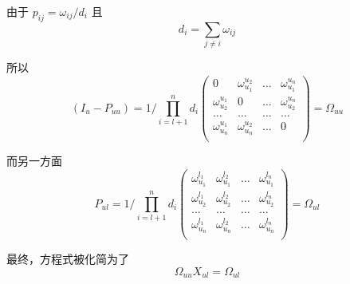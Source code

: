 \documentclass[notheorems, UTF8]{ctexbeamer}
\begin{document}
\begin{frame}
由于 $p_{ij} = \omega_{ij} / d_i$ 且 
\begin{displaymath}
d_i = \sum_{j \neq i} \omega_{ij}
\end{displaymath}

所以
\begin{displaymath}
(I_u - P_{uu}) = 1 / \prod_{i = l + 1}^{n}d_i \left(
\begin{array}{cccc}
0 & \omega_{u_1}^{u_2} & \ldots & \omega_{u_1}^{u_n}  \\
\omega_{u_2}^{u_1} & 0 & \ldots & \omega_{u_2}^{u_n}  \\
\ldots & \ldots & \ldots & \ldots \\
\omega_{u_n}^{u_1} & \omega_{u_n}^{u_2} & \ldots & 0  \\
\end{array}
\right) = \Omega_{uu}
\end{displaymath}

而另一方面
\begin{displaymath}
P_{ul} = 1 / \prod_{i = l + 1}^{n}d_i \left(
\begin{array}{cccc}
\omega_{u_1}^{l_1} & \omega_{u_1}^{l_2} & \ldots & \omega_{u_1}^{l_n}  \\
\omega_{u_2}^{l_1} & \omega_{u_2}^{l_2} & \ldots & \omega_{u_2}^{l_n}  \\
\ldots & \ldots & \ldots & \ldots \\
\omega_{u_n}^{l_1} & \omega_{u_n}^{l_2} & \ldots & \omega_{u_n}^{l_n}  \\
\end{array}
\right) = \Omega_{ul}
\end{displaymath}

最终，方程式被化简为了
\begin{displaymath}
\Omega_{uu}X_{ul} = \Omega_{ul}
\end{displaymath}
\end{frame}
\end{document}
